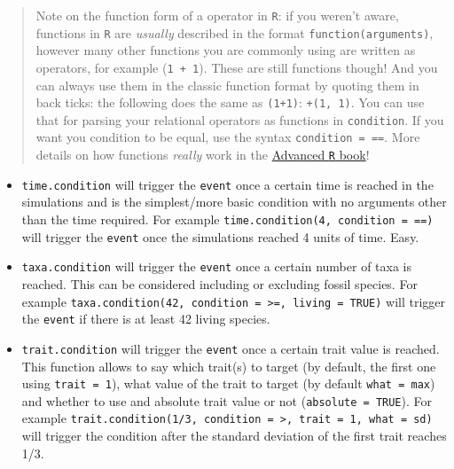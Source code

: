 \documentclass[
]{book}
\providecommand{\tightlist}{%
  \setlength{\itemsep}{0pt}\setlength{\parskip}{0pt}}
\begin{document}
\begin{quote}
Note on the function form of a operator in \texttt{R}: if you weren't aware, functions in \texttt{R} are \emph{usually} described in the format \texttt{function(arguments)}, however many other functions you are commonly using are written as operators, for example (\texttt{1\ +\ 1}). These are still functions though! And you can always use them in the classic function format by quoting them in back ticks: the following does the same as \texttt{(1+1)}: \texttt{\textasciigrave{}+\textasciigrave{}(1,\ 1)}. You can use that for parsing your relational operators as functions in \texttt{condition}. If you want you condition to be equal, use the syntax \texttt{condition\ =\ \textasciigrave{}==\textasciigrave{}}. More details on how functions \emph{really} work in the \href{https://adv-r.hadley.nz/functions.html}{Advanced \texttt{R} book}!
\end{quote}

\begin{itemize}
\tightlist
\item
  \texttt{time.condition} will trigger the \texttt{event} once a certain time is reached in the simulations and is the simplest/more basic condition with no arguments other than the time required. For example \texttt{time.condition(4,\ condition\ =\ \textasciigrave{}==\textasciigrave{})} will trigger the \texttt{event} once the simulations reached 4 units of time. Easy.
\item
  \texttt{taxa.condition} will trigger the \texttt{event} once a certain number of taxa is reached. This can be considered including or excluding fossil species. For example \texttt{taxa.condition(42,\ condition\ =\ \textasciigrave{}\textgreater{}=\textasciigrave{},\ living\ =\ TRUE)} will trigger the \texttt{event} if there is at least 42 living species.
\item
  \texttt{trait.condition} will trigger the \texttt{event} once a certain trait value is reached. This function allows to say which trait(s) to target (by default, the first one using \texttt{trait\ =\ 1}), what value of the trait to target (by default \texttt{what\ =\ max}) and whether to use and absolute trait value or not (\texttt{absolute\ =\ TRUE}). For example \texttt{trait.condition(1/3,\ condition\ =\ \textasciigrave{}\textgreater{}\textasciigrave{},\ trait\ =\ 1,\ what\ =\ sd)} will trigger the condition after the standard deviation of the first trait reaches 1/3.
\end{itemize}
\end{document}
